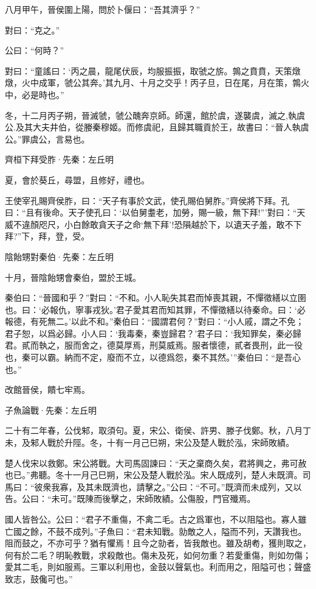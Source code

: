 \documentclass[12pt,a4paper]{ctexbook}
\begin{document}
八月甲午，晉侯圍上陽，問於卜偃曰：“吾其濟乎？”\par
對曰：“克之。”\par
公曰：“何時？”\par
對曰：“童謠曰：‘丙之晨，龍尾伏辰，均服振振，取虢之旂。鶉之賁賁，天策燉燉，火中成軍，虢公其奔。’其九月、十月之交乎！丙子旦，日在尾，月在策，鶉火中，必是時也。”\par
冬，十二月丙子朔，晉滅虢，虢公醜奔京師。師還，館於虞，遂襲虞，滅之,執虞公.及其大夫井伯，從媵秦穆姬。而修虞祀，且歸其職貢於王，故書曰：“晉人執虞公。”罪虞公，言易也。\par
齊桓下拜受胙·先秦：左丘明 \par
夏，會於葵丘，尋盟，且修好，禮也。\par
王使宰孔賜齊侯胙，曰：“天子有事於文武，使孔賜伯舅胙。”齊侯將下拜。孔曰：“且有後命。天子使孔曰：‘以伯舅耋老，加勞，賜一級，無下拜!”’對曰：“天威不違顏咫尺，小白餘敢貪天子之命‘無下拜’!恐隕越於下，以遺天子羞，敢不下拜?”下，拜，登，受。\par
陰飴甥對秦伯·先秦：左丘明 \par
十月，晉陰飴甥會秦伯，盟於王城。\par
秦伯曰：“晉國和乎？”對曰：“不和。小人恥失其君而悼喪其親，不憚徵繕以立圉也。曰：‘必報仇，寧事戎狄。’君子愛其君而知其罪，不憚徵繕以待秦命。曰：‘必報德，有死無二。’以此不和。”秦伯曰：“國謂君何？”對曰：“小人戚，謂之不免；君子恕，以爲必歸。小人曰：‘我毒秦，秦豈歸君？’君子曰：‘我知罪矣，秦必歸君。貳而執之，服而舍之，德莫厚焉，刑莫威焉。服者懷德，貳者畏刑，此一役也，秦可以霸。納而不定，廢而不立，以德爲怨，秦不其然。’”秦伯曰：“是吾心也。”\par
改館晉侯，饋七牢焉。\par
子魚論戰·先秦：左丘明 \par
二十有二年春，公伐邾，取須句。夏，宋公、衛侯、許男、滕子伐鄭。秋，八月丁未，及邾人戰於升陘。冬，十有一月己巳朔，宋公及楚人戰於泓，宋師敗績。\par
楚人伐宋以救鄭。宋公將戰。大司馬固諫曰：“天之棄商久矣，君將興之，弗可赦也已。”弗聽。冬十一月己巳朔，宋公及楚人戰於泓。宋人既成列，楚人未既濟。司馬曰：“彼衆我寡，及其未既濟也，請擊之。”公曰：“不可。”既濟而未成列，又以告。公曰：“未可。”既陳而後擊之，宋師敗績。公傷股，門官殲焉。\par
國人皆咎公。公曰：“君子不重傷，不禽二毛。古之爲軍也，不以阻隘也。寡人雖亡國之餘，不鼓不成列。”子魚曰：“君未知戰。勍敵之人，隘而不列，天讚我也。阻而鼓之，不亦可乎？猶有懼焉！且今之勍者，皆我敵也。雖及胡耇，獲則取之，何有於二毛？明恥教戰，求殺敵也。傷未及死，如何勿重？若愛重傷，則如勿傷；愛其二毛，則如服焉。三軍以利用也，金鼓以聲氣也。利而用之，阻隘可也；聲盛致志，鼓儳可也。”\par
\end{document}
